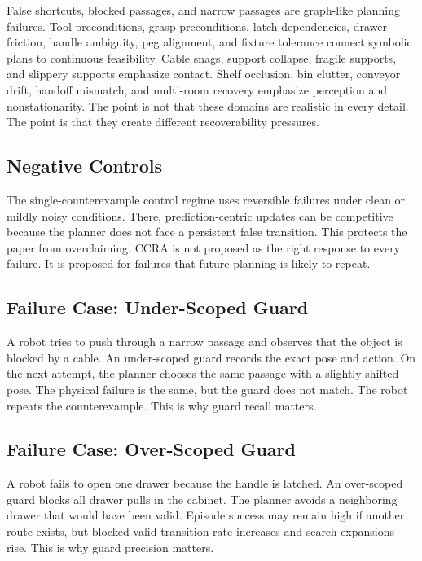\documentclass{article}
\newcommand{\ccra}{\textsc{CCRA}}
\begin{document}
False shortcuts, blocked passages, and narrow passages are graph-like planning
failures. Tool preconditions, grasp preconditions, latch dependencies, drawer
friction, handle ambiguity, peg alignment, and fixture tolerance connect
symbolic plans to continuous feasibility. Cable snags, support collapse, fragile
supports, and slippery supports emphasize contact. Shelf occlusion, bin clutter,
conveyor drift, handoff mismatch, and multi-room recovery emphasize perception
and nonstationarity. The point is not that these domains are realistic in every
detail. The point is that they create different recoverability pressures.

\subsection{Negative Controls}

The single-counterexample control regime uses reversible failures under clean
or mildly noisy conditions. There, prediction-centric updates can be
competitive because the planner does not face a persistent false transition.
This protects the paper from overclaiming. \ccra{} is not proposed as the right
response to every failure. It is proposed for failures that future planning is
likely to repeat.

\subsection{Failure Case: Under-Scoped Guard}

A robot tries to push through a narrow passage and observes that the object is
blocked by a cable. An under-scoped guard records the exact pose and action. On
the next attempt, the planner chooses the same passage with a slightly shifted
pose. The physical failure is the same, but the guard does not match. The robot
repeats the counterexample. This is why guard recall matters.

\subsection{Failure Case: Over-Scoped Guard}

A robot fails to open one drawer because the handle is latched. An over-scoped
guard blocks all drawer pulls in the cabinet. The planner avoids a neighboring
drawer that would have been valid. Episode success may remain high if another
route exists, but blocked-valid-transition rate increases and search expansions
rise. This is why guard precision matters.
\end{document}
